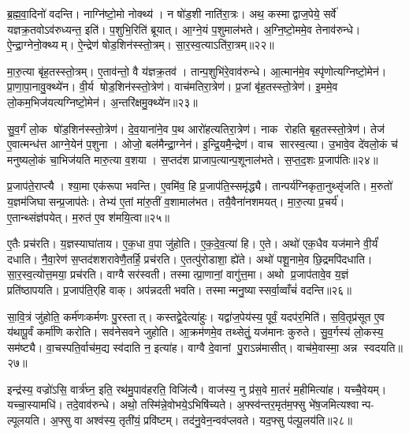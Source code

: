 ब्र॒ह्म॒वा॒दिनो॑ वदन्ति। नाग्नि॑ष्टो॒मो नोक्थ्य॑। न षो॑ड॒शी नाति॑रा॒त्रः। अथ॒ कस्माद्वाज॒पेये॒ सर्वे॑ यज्ञक्र॒तवोऽव॑रुध्यन्त॒ इति॑। प॒शुभि॒रिति॑ ब्रूयात्। आ॒ग्ने॒यं प॒शुमाल॑भते। अ॒ग्नि॒ष्टो॒ममे॒व तेनाव॑रुन्धे। ऐ॒न्द्रा॒ग्नेनो॒क्थ्यम्। ऐ॒न्द्रेण॑ षोड॒शिन॑स्स्तो॒त्रम्। सा॒र॒स्व॒त्याऽति॑रा॒त्रम्॥२२॥

मा॒रु॒त्या बृ॑ह॒तस्स्तो॒त्रम्। ए॒ताव॑न्तो॒ वै य॑ज्ञक्र॒तव॑। तान्प॒शुभि॑रे॒वाव॑रुन्धे। आ॒त्मान॑मे॒व स्पृ॑णोत्यग्निष्टो॒मेन॑। प्रा॒णा॒पा॒नावु॒क्थ्ये॑न। वी॒र्य षोड॒शिन॑स्स्तो॒त्रेण॑। वाच॑मतिरा॒त्रेण॑। प्र॒जां बृ॑ह॒तस्स्तो॒त्रेण॑। इ॒ममे॒व लो॒कम॒भिज॑यत्यग्निष्टो॒मेन॑। अ॒न्तरि॑क्षमु॒क्थ्ये॑न॥२३॥

सु॒व॒र्गं लो॒क षो॑ड॒शिन॑स्स्तो॒त्रेण॑। दे॒व॒याना॑ने॒व प॒थ आरो॑हत्यतिरा॒त्रेण॑। नाक रोहति बृह॒तस्स्तो॒त्रेण॑। तेज॑ ए॒वात्मन्ध॑त्त आग्ने॒येन॑ प॒शुना। ओजो॒ बल॑मैन्द्रा॒ग्नेन॑। इ॒न्द्रि॒यमै॒न्द्रेण॑। वाच सारस्व॒त्या। उ॒भावे॒व दे॑वलो॒कं च॑ मनुष्यलो॒कं चा॒भिज॑यति मारु॒त्या व॒शया। स॒प्तद॑श प्राजाप॒त्यान्प॒शूनाल॑भते। स॒प्त॒द॒शः प्र॒जाप॑तिः॥२४॥

प्र॒जाप॑ते॒राप्त्यै। श्या॒मा एक॑रूपा भवन्ति। ए॒वमि॑व॒ हि प्र॒जाप॑ति॒स्समृ॑द्ध्यै। तान्पर्य॑ग्निकृता॒नुथ्सृ॑जति। म॒रुतो॑ य॒ज्ञम॑जिघासन्प्र॒जाप॑तेः। तेभ्य॑ ए॒तां मा॑रु॒तीं व॒शामाल॑भत। तयै॒वैना॑नशमयत्। मा॒रु॒त्या प्र॒चर्य॑। ए॒तान्थ्संज्ञ॑पयेत्। म॒रुत॑ ए॒व श॑मयि॒त्वा॥२५॥

ए॒तैः प्रच॑रति। य॒ज्ञस्याघा॑ताय। ए॒क॒धा व॒पा जु॑होति। ए॒क॒दे॒व॒त्या॑ हि। ए॒ते। अथो॑ एक॒धैव यज॑माने वी॒र्यं॑ दधाति। नै॒वा॒रेण॑ स॒प्तद॑शशरावेणै॒तर्\mbox{}हि॒ प्रच॑रति। ए॒तत्पु॑रोडाशा॒ ह्ये॑ते। अथो॑ पशू॒नामे॒व छि॒द्रमपि॑दधाति। सा॒र॒स्व॒त्योत्त॒मया॒ प्रच॑रति। वाग्वै सर॑स्वती। तस्मात्प्रा॒णानां॒ वागु॑त्त॒मा। अथो प्र॒जाप॑तावे॒व य॒ज्ञं प्रति॑ष्ठापयति। प्र॒जाप॑ति॒र्‌हि वाक्। अप॑न्नदती भवति। तस्मान्मनु॒ष्यास्सर्वा॒व्वाँचं॑ वदन्ति॥२६॥\anuvakamend[अ॒ति॒रा॒त्रम॒न्तरि॑क्षमु॒क्थ्ये॑न प्र॒जाप॑तिश्शमयि॒त्वोत्त॒मया॒ प्रच॑रति॒ षट् च॑]

सा॒वि॒त्रं जु॑होति॒ कर्म॑णःकर्मणः पु॒रस्तात्। कस्तद्वे॒देत्या॑हुः। यद्वा॑ज॒पेय॑स्य॒ पूर्वं॒ यदप॑र॒मिति॑। स॒वि॒तृप्र॑सूत ए॒व य॑थापू॒र्वं कर्मा॑णि करोति। सव॑नेसवने जुहोति। आ॒क्रम॑णमे॒व तथ्सेतुं॒ यज॑मानः कुरुते। सु॒व॒र्गस्य॑ लो॒कस्य॒ सम॑ष्ट्यै। वा॒चस्पति॒र्वाच॑म॒द्य स्व॑दाति न॒ इत्या॑ह। वाग्वै दे॒वानां पु॒राऽन्न॑मासीत्। वाच॑मे॒वास्मा॒ अन्न स्वदयति॥२७॥

इन्द्र॑स्य॒ वज्रो॑ऽसि॒ वार्त्र॑घ्न॒ इति॒ रथ॑मु॒पाव॑हरति॒ विजि॑त्यै। वाज॑स्य॒ नु प्र॑स॒वे मा॒तरं॑ म॒हीमित्या॑ह। यच्चै॒वेयम्। यच्चा॒स्यामधि॑। तदे॒वाव॑रुन्धे। अथो॒ तस्मि॑न्ने॒वोभये॒ऽभिषि॑च्यते। अ॒फ्स्व॑न्तर॒मृत॑म॒फ्सु भे॑ष॒जमित्यश्वान्प- ल्पूलयति। अ॒फ्सु वा अश्व॑स्य॒ तृती॑यं॒ प्रवि॑ष्टम्। तद॑नु॒वेन॒न्वव॑प्लवते। यद॒फ्सु प॑ल्पू॒लय॑ति॥२८॥

